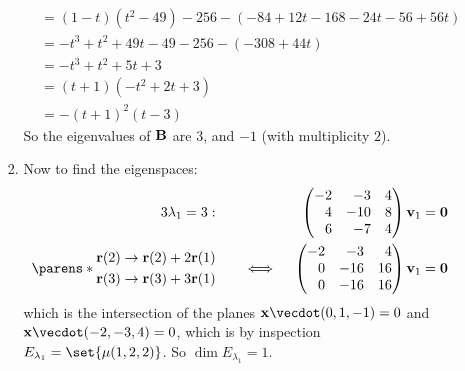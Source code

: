 \documentclass[fleqn,a4paper,11pt]{article}
\begin{document}
\begin{enumerate}[label=\textbf{\arabic*.}]
\begin{enumerate}[label=(\textbf{\Alph*})]
\begin{enumerate}[label=(\roman*)]
\begin{align*}
         &= (1 - t)(t^2 - 49) - 256 - (-84 + 12t - 168 - 24t - 56 + 56t) \\
         &= -t^3 + t^2 + 49t - 49 - 256 - (-308 + 44t) \\
         &= -t^3 + t^2 + 5t + 3 \\
         &= (t + 1)(-t^2 + 2t + 3) \\
         &= -(t + 1)^2(t - 3)
       \end{align*}
       So the eigenvalues of \(\mathbf{B}\) are \(3\), and \(-1\) (with multiplicity
       \(2\)).
      \item
       Now to find the eigenspaces:
       \begin{alignat*}3
        \lambda_1 = 3:\quad
        && &&\begin{pmatrix*}[r]
         -2 & -3 & 4 \\
         4 & -10 & 8 \\
         6 & -7 & 4
        \end{pmatrix*}
        \vec v_1 &= \vec 0 \\
        \parens*{
         \begin{aligned}
          \vec r(2) &\to \vec r(2) + 2 \vec r(1) \\
          \vec r(3) &\to \vec r(3) + 3 \vec r(1) \\
         \end{aligned}
        } \quad
        &&\iff{}&&\begin{pmatrix*}[r]
         -2 & -3 & 4 \\
         0 & -16 & 16 \\
         0 & -16 & 16
        \end{pmatrix*}
        \vec v_1 &= \vec 0
       \end{alignat*}
       which is the intersection of the planes
       \(\vec x \vecdot (0, 1, -1) = 0\) and
       \(\vec x \vecdot (-2, -3, 4) = 0\), which is by inspection
       \(E_{\lambda_1} = \set{\mu(1, 2, 2)}\). So
       \(\dim E_{\lambda_1} = 1\).


\end{enumerate}
\end{enumerate}
\end{enumerate}
\end{document}
